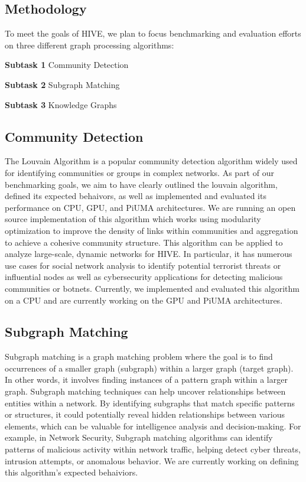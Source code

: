\documentclass[letterpaper, 10pt]{article}
\begin{document}
\begin{multicols}{2}
    \section{Methodology}
    To meet the goals of HIVE, we plan to focus benchmarking and evaluation efforts on three different graph processing algorithms:
    \newline
    
        \textbf{Subtask 1} Community Detection
        
        \textbf{Subtask 2} Subgraph Matching
        
        \textbf{Subtask 3} Knowledge Graphs
        
        \subsection{Community Detection}
            The Louvain Algorithm is a popular community detection algorithm widely used for identifying communities or groups in complex networks. As part of our benchmarking goals, we aim to have clearly outlined the louvain algorithm, defined its expected behaivors, as well as implemented and evaluated its performance on CPU, GPU, and PiUMA architectures. We are running an open source implementation of this algorithm which works using modularity optimization to improve the density of links within communities and aggregation to achieve a cohesive community structure. This algorithm can be applied to analyze large-scale, dynamic networks for HIVE.  In particular, it has numerous use cases for social network analysis to identify potential terrorist threats or influential nodes as well as cybersecurity applications for detecting malicious communities or botnets. Currently, we implemented and evaluated this algorithm on a CPU and are currently working on the GPU and PiUMA architectures.
        \subsection{Subgraph Matching}
            Subgraph matching is a graph matching problem where the goal is to find occurrences of a smaller graph (subgraph) within a larger graph (target graph). In other words, it involves finding instances of a pattern graph within a larger graph. Subgraph matching techniques can help uncover relationships between entities within a network. By identifying subgraphs that match specific patterns or structures, it could potentially reveal hidden relationships between various elements, which can be valuable for intelligence analysis and decision-making. For example, in Network Security, Subgraph matching algorithms can identify patterns of malicious activity within network traffic, helping detect cyber threats, intrusion attempts, or anomalous behavior. We are currently working on defining this algorithm's expected behaiviors. 


\end{multicols}
\end{document}
